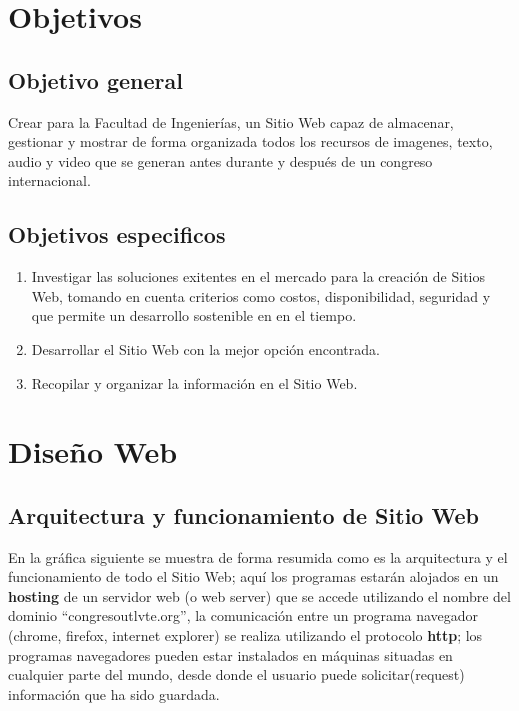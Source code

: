 \documentclass[a4paper,14px]{article}
\begin{document}
\section{Objetivos}
\label{sec:objetivo}

\subsection{Objetivo general}
\label{sec:objetivo-general}



Crear para la Facultad de Ingenierías, un Sitio Web capaz de almacenar, gestionar y mostrar de forma organizada todos los recursos de imagenes, texto, audio y video que se generan antes durante y después de un congreso internacional.

\subsection{Objetivos especificos}
\label{sec:objet-espec}

\begin{enumerate}
\item Investigar las soluciones exitentes en el mercado para la creación de Sitios Web, tomando en cuenta criterios como costos, disponibilidad, seguridad y que permite un desarrollo sostenible en en el tiempo.
\item Desarrollar el Sitio Web con la mejor opción encontrada.
\item Recopilar y organizar la información en el Sitio Web.
\end{enumerate}

\newpage
\section{Diseño Web}
\label{sec:descripcion-de-la}

\subsection{Arquitectura y funcionamiento  de Sitio Web}
\label{sec:arqu-de-sitio}


En la gráfica siguiente se muestra de forma resumida como es la arquitectura y el funcionamiento de todo el Sitio Web; aquí los programas estarán alojados en un \textbf{hosting} de un servidor web (o web server)  que se accede utilizando  el nombre del  dominio ``congresoutlvte.org'', la comunicación entre un programa navegador (chrome, firefox, internet explorer) se realiza utilizando  el  protocolo \textbf{http}; los programas navegadores pueden estar instalados en máquinas situadas en cualquier parte del mundo, desde donde el usuario puede solicitar(request) información  que ha sido guardada. \\
\end{document}
